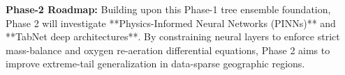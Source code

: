 \documentclass[journal,10pt,twocolumn]{IEEEtran}
\begin{document}
\textbf{Phase-2 Roadmap:} Building upon this Phase-1 tree ensemble foundation, Phase 2 will investigate **Physics-Informed Neural Networks (PINNs)** and **TabNet deep architectures**. By constraining neural layers to enforce strict mass-balance and oxygen re-aeration differential equations, Phase 2 aims to improve extreme-tail generalization in data-sparse geographic regions.



\end{document}
